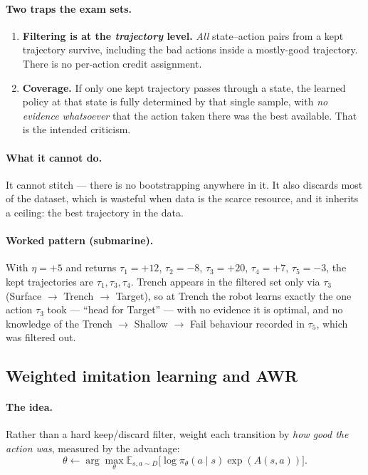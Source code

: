 \documentclass[11pt,a4paper]{article}
\begin{document}
\paragraph{Two traps the exam sets.}
\begin{enumerate}[label=(\roman*)]
\item \textbf{Filtering is at the \emph{trajectory} level.} \emph{All}
state--action pairs from a kept trajectory survive, including the bad actions
inside a mostly-good trajectory. There is no per-action credit assignment.
\item \textbf{Coverage.} If only one kept trajectory passes through a state,
the learned policy at that state is fully determined by that single sample,
with \emph{no evidence whatsoever} that the action taken there was the best
available. That is the intended criticism.
\end{enumerate}

\paragraph{What it cannot do.} It cannot stitch --- there is no bootstrapping
anywhere in it. It also discards most of the dataset, which is wasteful when
data is the scarce resource, and it inherits a ceiling: the best trajectory in
the data.

\paragraph{Worked pattern (submarine).} With $\eta=+5$ and returns
$\tau_1=+12$, $\tau_2=-8$, $\tau_3=+20$, $\tau_4=+7$, $\tau_5=-3$, the kept
trajectories are $\tau_1,\tau_3,\tau_4$. Trench appears in the filtered set
only via $\tau_3$ (Surface $\to$ Trench $\to$ Target), so at Trench the robot
learns exactly the one action $\tau_3$ took --- ``head for Target'' --- with
no evidence it is optimal, and no knowledge of the Trench $\to$ Shallow
$\to$ Fail behaviour recorded in $\tau_5$, which was filtered out.

\subsection{Weighted imitation learning and AWR}

\paragraph{The idea.} Rather than a hard keep/discard filter, weight each
transition by \emph{how good the action was}, measured by the advantage:
\[
\theta\leftarrow \arg\max_\theta \mathbb E_{s,a\sim D}\bigl[\log\pi_\theta(a\mid s)\exp(A(s,a))\bigr].
\]
\end{document}
